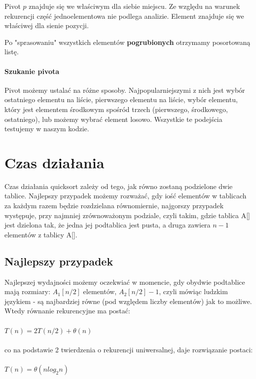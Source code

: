 \documentclass[a4paper,11pt]{report}
\begin{document}
Pivot $p$ znajduje się we właściwym dla siebie miejscu. Ze względu na warunek rekurencji część jednoelementowa nie podlega analizie. Element znajduje się we właściwej dla sienie pozycji.


Po "sprasowaniu" wszystkich elementów \textbf{pogrubionych} otrzymamy posortowaną listę.
\paragraph{Szukanie pivota}
Pivot możemy ustalać na różne sposoby. Najpopularniejszymi z nich jest wybór ostatniego elementu na liście, pierwszego elementu na liście, wybór elementu, który jest elementem środkowym spośród trzech (pierwszego, środkowego, ostatniego), lub możemy wybrać element losowo. Wszystkie te podejścia testujemy w naszym kodzie.

\section{Czas działania}
Czas działania quicksort zależy od tego, jak równo zostaną podzielone dwie tablice. Najlepszy przypadek możemy rozważać, gdy iość elementów w tablicach za każdym razem będzie rozdzielana równomiernie, najgorszy przypadek występuje, przy najmniej zrównoważonym podziale, czyli takim, gdzie tablica A[] jest dzielona tak, że jedna jej podtablica jest pusta, a druga zawiera $n-1$ elementów z tablicy A[].
\subsection{Najlepszy przypadek}
Najlepszej wydajności możemy oczekwiać w momencie, gdy obydwie podtablice mają rozmiary: $A_{1}[n/2]$ elementów,  $A_{2}[n/2] - 1$, czyli mówiąc ludzkim językiem - są najbardziej równe (pod względem liczby elementów) jak to możliwe. Wtedy równanie rekurencyjne ma postać: \\
\\
$T(n) = 2T(n/2) + \theta(n)$\\
\\
co na podstawie 2 twierdzenia o rekurencji uniwersalnej, daje rozwiązanie postaci: \\
\\
$T(n) = \theta(n log_{2} n)$
\end{document}
